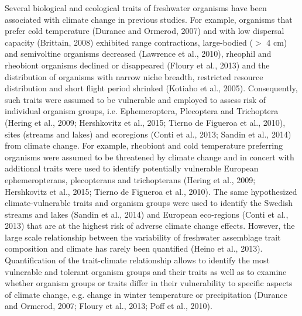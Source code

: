 Several biological and ecological traits of freshwater organisms have been associated with climate change in previous studies. For example, organisms that prefer cold temperature (Durance and Ormerod, 2007) and with low dispersal capacity (Brittain, 2008) exhibited range contractions, large-bodied ($>$ 4 cm) and semivoltine organisms decreased (Lawrence et al., 2010), rheophil and rheobiont organisms declined or disappeared (Floury et al., 2013) and the distribution of organisms with narrow niche breadth, restricted resource distribution and short flight period shrinked (Kotiaho et al., 2005). Consequently, such traits were assumed to be vulnerable and employed to assess risk of individual organism groups, i.e. Ephemeroptera, Plecoptera and Trichoptera (Hering et al., 2009; Hershkovitz et al., 2015; Tierno de Figueroa et al., 2010), sites (streams and lakes) and ecoregions (Conti et al., 2013; Sandin et al., 2014) from climate change. For example, rheobiont and cold temperature preferring organisms were assumed to be threatened by climate change and in concert with additional traits were used to identify potentially vulnerable European ephemeropterans, plecopterans and trichopterans (Hering et al., 2009; Hershkovitz et al., 2015; Tierno de Figueroa et al., 2010). The same hypothesized climate-vulnerable traits and organism groups were used to identify the Swedish streams and lakes (Sandin et al., 2014) and European eco-regions (Conti et al., 2013) that are at the highest risk of adverse climate change effects. However, the large scale relationship between the variability of freshwater assemblage trait composition and climate has rarely been quantified (Heino et al., 2013). Quantification of the trait-climate relationship allows to identify the most vulnerable and tolerant organism groups and their traits as well as to examine whether organism groups or traits differ in their vulnerability to specific aspects of climate change, e.g. change in winter temperature or precipitation (Durance and Ormerod, 2007; Floury et al., 2013; Poff et al., 2010).

